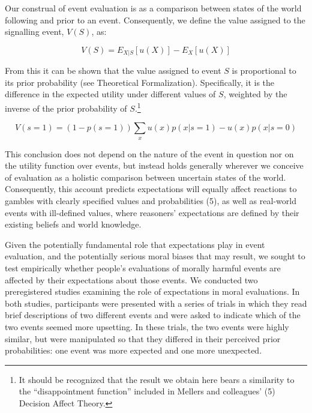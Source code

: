 \documentclass[9pt,twocolumn,twoside,]{pnas-new}
\begin{document}
Our construal of event evaluation is as a comparison between states of
the world following and prior to an event. Consequently, we define the
value assigned to the signalling event, \(V(S)\), as:

\begin{equation*}
V(S) = E_{X|S}[u(X)] - E_X[u(X)]
\end{equation*}

From this it can be shown that the value assigned to event \(S\) is
proportional to its prior probability (see Theoretical Formalization).
Specifically, it is the difference in the expected utility under
different values of \(S\), weighted by the inverse of the prior
probability of \(S\).\footnote{It should be recognized that the result
  we obtain here bears a similarity to the ``disappointment function''
  included in Mellers and colleagues' (5) Decision Affect Theory.}

\begin{equation*}
V(s=1)=(1-p(s=1))\sum_x u(x)p(x|s=1) - u(x)p(x|s=0)
\end{equation*}

This conclusion does not depend on the nature of the event in question
nor on the utility function over events, but instead holds generally
wherever we conceive of evaluation as a holistic comparison between
uncertain states of the world. Consequently, this account predicts
expectations will equally affect reactions to gambles with clearly
specified values and probabilities (5), as well as real-world events
with ill-defined values, where reasoners' expectations are defined by
their existing beliefs and world knowledge.

Given the potentially fundamental role that expectations play in event
evaluation, and the potentially serious moral biases that may result, we
sought to test empirically whether people's evaluations of morally
harmful events are affected by their expectations about those events. We
conducted two preregistered studies examining the role of expectations
in moral evaluations. In both studies, participants were presented with
a series of trials in which they read brief descriptions of two
different events and were asked to indicate which of the two events
seemed more upsetting. In these trials, the two events were highly
similar, but were manipulated so that they differed in their perceived
prior probabilities: one event was more expected and one more
unexpected.
\end{document}

